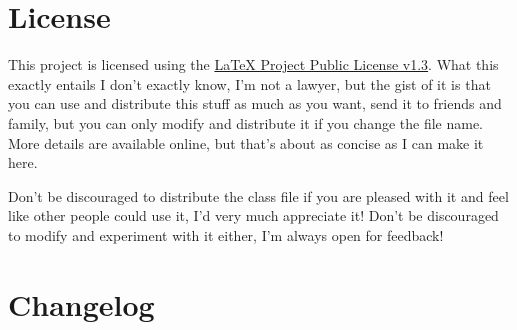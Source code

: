 \documentclass[palatino,english]{ist-report}
\begin{document}
\section{License}

This project is licensed using the \href{https://www.latex-project.org/lppl/}{\LaTeX{} Project Public License v1.3}. What this exactly entails I don't exactly know, I'm not a lawyer, but the gist of it is that you can use and distribute this stuff as much as you want, send it to friends and family, but you can only modify and distribute it if you change the file name. More details are available online, but that's about as concise as I can make it here.

Don't be discouraged to distribute the class file if you are pleased with it and feel like other people could use it, I'd very much appreciate it! Don't be discouraged to modify and experiment with it either, I'm always open for feedback!

\section{Changelog}
\end{document}
